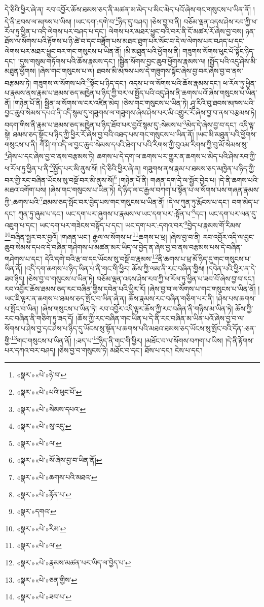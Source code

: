 དེ་ཅིའི་ཕྱིར་ཞེ་ན། རབ་འབྱོར་ཆོས་ཐམས་ཅད་ནི་མཚན་མ་མེད་པ་མིང་མེད་པའོ་ཞེས་གང་གསུངས་པ་ཡིན་ནོ། །དེ་ནི་ཐབས་ལ་མཁས་པ་ཡིས། །ཡང་དག་:དགེ་བ་\footnote{«སྣར་»«པེ་»ཉེ་བ་}ཉིད་དུ་བཤད། །ཅེས་བྱ་བ་ནི། བཅོམ་ལྡན་འདས་ཤེས་རབ་ཀྱི་ཕ་རོལ་ཏུ་ཕྱིན་པ་འདི་ལེགས་པར་བཤད་པ་དང་། ལེགས་པར་མཐར་ཕྱུང་བའི་བར་ནི་ངོ་མཚར་རོ་ཞེས་བྱ་བས། ཉན་ཐོས་ལ་སོགས་པའི་རྟོགས་པ་ཉི་ཚེ་བ་དང་བཟློག་པས་མཐར་ཐུག་པར་སོང་བ་དེ་ལ་ལེགས་པར་བཤད་པ་དང་ལེགས་པར་མཐར་ཕྱུང་བར་གང་གསུངས་པ་ཡིན་ནོ། །མི་མཐུན་པའི་ཕྱོགས་ནི། གཟུགས་སོགས་ཕུང་པོ་སྟོང་ཉིད་དང་། །དུས་གསུམ་གཏོགས་པའི་ཆོས་རྣམས་དང་། །སྦྱིན་སོགས་བྱང་ཆུབ་ཕྱོགས་རྣམས་ལ། །སྤྱོད་པའི་འདུ་ཤེས་མི་མཐུན་ཕྱོགས། །ཞེས་གང་གསུངས་པ་ལ། ཐབས་མི་མཁས་པས་དེ་གཟུགས་སྟོང་ཞེས་བྱ་བར་ཞེས་བྱ་བ་ནས་བརྩམས་ཏེ། གཟུགས་ལ་སོགས་པའི་\footnote{«སྣར་»«པེ་»པའི་ཕུང་པོ་}སྟོང་པ་ཉིད་དང་། འདས་པ་ལ་སོགས་པའི་ཆོས་རྣམས་དང་། ཕ་རོལ་ཏུ་ཕྱིན་པ་རྣམས་ནས་རྣམ་པ་ཐམས་ཅད་མཁྱེན་པ་ཉིད་ཀྱི་བར་ལ་སྤྱོད་པའི་འདུ་ཤེས་ནི་ཆགས་པའོ་ཞེས་གསུངས་པ་ཡིན་ནོ། །གཉེན་པོ་ནི། སྦྱིན་ལ་སོགས་ལ་ངར་འཛིན་མེད། །ཅེས་གང་གསུངས་པ་ཡིན་ཏེ། ཤཱ་རིའི་བུ་ཐབས་མཁས་པའི་བྱང་ཆུབ་སེམས་དཔའ་ནི་འདི་སྙམ་དུ་གཟུགས་ལ་གཟུགས་ཞེས་ཤེས་པར་མི་འགྱུར་རོ་ཞེས་བྱ་བ་ནས་བརྩམས་ཏེ། བདག་གིས་ནི་རྣམ་པ་ཐམས་ཅད་མཁྱེན་པ་ཉིད་ཐོབ་པར་བྱའོ་སྙམ་དུ་:སེམས་པ་\footnote{«སྣར་»«པེ་»སེམས་དཔའ་}མེད་དེ་ཞེས་བྱ་བ་དང་། འདི་ལྟ་སྟེ། ཐམས་ཅད་སྟོང་པ་ཉིད་ཀྱི་ཕྱིར་རོ་ཞེས་བྱ་བའི་འཐད་པས་གང་གསུངས་པ་ཡིན་ནོ། །ཡང་མི་མཐུན་པའི་ཕྱོགས་གསུངས་པ་ནི། ཀཽ་ཤི་ཀ་འདི་ལ་བྱང་ཆུབ་སེམས་དཔའི་ཐེག་པ་པའི་རིགས་ཀྱི་བུའམ་རིགས་ཀྱི་བུ་མོ་སེམས་སུ་\footnote{«སྣར་»«པེ་»སུ་འདུ་}ཤེས་པ་དང་ཞེས་བྱ་བ་ནས་བརྩམས་ཏེ། ཆགས་པ་དེ་དག་ལ་ཆགས་པར་གྱུར་ན་ཆགས་པ་མེད་པའི་ཤེས་རབ་ཀྱི་ཕ་རོལ་ཏུ་ཕྱིན་པ་ནི་\footnote{«སྣར་»«པེ་»ལ་}སྤྱོད་པར་མི་ནུས་སོ། །དེ་ཅིའི་ཕྱིར་ཞེ་ན། གཟུགས་ནས་རྣམ་པ་ཐམས་ཅད་མཁྱེན་པ་ཉིད་ཀྱི་བར་གྱི་རང་བཞིན་ཡོངས་སུ་བསྔོ་བར་མི་ནུས་སོ།\footnote{«སྣར་»«པེ་»སོ་ཞེས་བྱ་བ་ཡིན་ནོ།} །གཉེན་པོ་ནི། གཞན་དག་དེ་ལ་སྦྱོར་བྱེད་པ། །དེ་ནི་ཆགས་པའི་མཐའ་འགོག་པས། །ཞེས་གང་གསུངས་པ་ཡིན་ཏེ། དེ་ཉིད་ལ་ང་རྒྱལ་བཀག་པ་སྟོན་པ་ལ་སོགས་པས་གཞན་རྣམས་ཀྱི་:ཆགས་པའི་\footnote{«སྣར་»«པེ་»ཆགས་པའི་མཐའ་}ཐམས་ཅད་སྤོང་བར་བྱེད་པས་གང་གསུངས་པ་ཡིན་ནོ། །དེ་ལ་ཀུན་ཏུ་རྨོངས་པ་དང་། བག་མེད་པ་དང་། ཀུན་ཏུ་ཞུམ་པ་དང་། ཡང་དག་པར་ཞུགས་པ་རྣམས་ལ་ཡང་དག་པར་:སྟོན་པ་\footnote{«སྣར་»«པེ་»རྟོན་པ་}དང་། ཡང་དག་པར་ལན་དུ་འཇུག་པ་དང་། ཡང་དག་པར་གཟེངས་བསྟོད་པ་དང་། ཡང་དག་པར་:དགའ་བར་\footnote{«སྣར་»དགའ་}བྱེད་པ་རྣམས་གོ་རིམས་\footnote{«སྣར་»«པེ་»རིམ་}བཞིན་སྦྱར་བར་བྱའོ། །གཞན་ཡང་། རྒྱལ་ལ་སོགས་པ་\footnote{«སྣར་»«པེ་»ལ་}ཆགས་པ་ཕྲ། །ཞེས་བྱ་བ་ནི། རབ་འབྱོར་འདི་ལ་བྱང་ཆུབ་སེམས་དཔའ་དེ་བཞིན་གཤེགས་པ་མཚན་མར་ཡིད་ལ་བྱེད་ན་ཞེས་བྱ་བ་ནས་བརྩམས་པས་དེ་བཞིན་གཤེགས་པ་དང་། དེའི་དགེ་བའི་རྩ་བ་དང་ཡོངས་སུ་བསྔོ་བ་རྣམས་\footnote{«སྣར་»«པེ་»རྣམས་མཚན་པར་ཡིད་ལ་བྱེད་པ་}ནི་ཆགས་པ་ཕྲ་མོ་ཉིད་དུ་གང་གསུངས་པ་ཡིན་ནོ། །འདི་དག་ཆགས་པ་ཉིད་ཡིན་པ་ནི་གང་གི་ཕྱིར། ཆོས་ཀྱི་ལམ་ནི་རང་བཞིན་གྱིས། །དབེན་པའི་ཕྱིར་ན་དེ་ཟབ་ཉིད། །ཅེས་བྱ་བ་གསུངས་པ་ཡིན་ཏེ། བཅོམ་ལྡན་འདས་ཤེས་རབ་ཀྱི་ཕ་རོལ་ཏུ་ཕྱིན་པ་ཟབ་བོ་ཞེས་བྱ་བ་དང་། རབ་འབྱོར་ཆོས་ཐམས་ཅད་རང་བཞིན་གྱིས་དབེན་པའི་ཕྱིར་རོ། །ཞེས་བྱ་བ་ལ་སོགས་པ་གང་གསུངས་པ་ཡིན་ནོ། །ཡང་ཇི་ལྟར་ན་ཆགས་པ་ཐམས་ཅད་སྤོང་བ་ཡིན་ཞེ་ན། ཆོས་རྣམས་རང་བཞིན་གཅིག་པར་ནི། །ཤེས་པས་ཆགས་པ་སྤོང་བ་ཡིན། །ཞེས་གསུངས་པ་ཡིན་ཏེ། རབ་འབྱོར་འདི་ལྟར་ཆོས་ཀྱི་རང་བཞིན་ནི་གཉིས་མ་ཡིན་ཏེ། ཆོས་ཀྱི་རང་བཞིན་ནི་གཅིག་ཏུ་ཟད་དོ། །ཆོས་ཀྱི་རང་བཞིན་གང་ཡིན་པ་དེ་ནི་རང་བཞིན་མ་ཡིན་པའོ་ཞེས་བྱ་བ་ལ་སོགས་པ་ཤེས་བྱ་དང་ཤེས་པ་ཉིད་དུ་ཡོངས་སུ་སྟོན་པ་ཆགས་པའི་མཐའ་ཐམས་ཅད་ཡོངས་སུ་སྤོང་བའི་དོན་:ཅན་གྱི་\footnote{«སྣར་»«པེ་»ཅན་གྱིས་}གང་གསུངས་པ་ཡིན་ནོ། །:ཟད་པ་\footnote{«སྣར་»«པེ་»ཟབ་པ་}ཉིད་ནི་གང་གི་ཕྱིར། །མཐོང་བ་ལ་སོགས་བཀག་པ་ཡིས། །དེ་ནི་རྟོགས་པར་དཀའ་བར་བཤད། །ཅེས་བྱ་བ་གསུངས་ཏེ། མཐོང་བ་དང་། ཐོས་པ་དང་། ངེས་པ་དང་། 